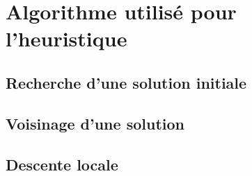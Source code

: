 \chapter{Algorithme utilisé pour l'heuristique}


\section{Recherche d'une solution initiale}

%


\section{Voisinage d'une solution}

%


\section{Descente locale}

%